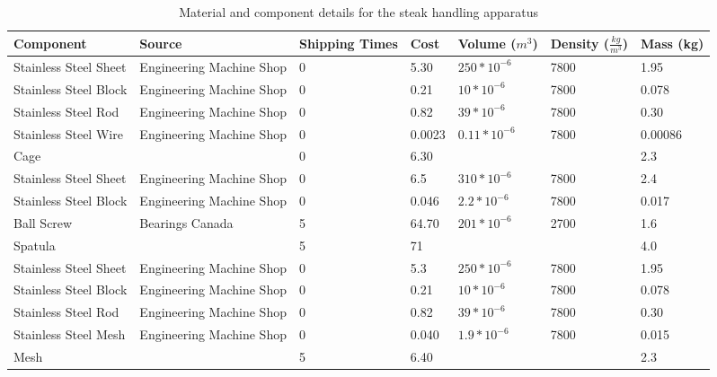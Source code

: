\documentclass[11pt]{article}
\begin{document}
\begin{table}[H]
\begin{tabularx}{\textwidth}{l l Z Z Z Z Z}

\hline

Component & Source & Shipping Times & Cost & Volume ($ m^3 $) & Density ($ \frac{kg}{m^3} $) & Mass (kg) \\

\hline

Stainless Steel Sheet & Engineering Machine Shop & 0 & 5.30 & $250*10^{-6}$ & 7800 \cite{densities} & 1.95 \\
Stainless Steel Block & Engineering Machine Shop & 0 & 0.21 & $10*10^{-6}$ & 7800 \cite{densities} & 0.078 \\
Stainless Steel Rod & Engineering Machine Shop & 0 & 0.82 & $39*10^{-6}$ & 7800 \cite{densities} & 0.30 \\
Stainless Steel Wire & Engineering Machine Shop & 0 & 0.0023 & $0.11*10^{-6}$ & 7800 \cite{densities} & 0.00086 \\

\hline

Cage & & 0 & 6.30 & & & 2.3 \\

\hline

Stainless Steel Sheet & Engineering Machine Shop & 0 & 6.5 & $310*10^{-6}$ & 7800 \cite{densities} & 2.4 \\
Stainless Steel Block & Engineering Machine Shop & 0 & 0.046 & $2.2*10^{-6}$ & 7800 \cite{densities} & 0.017 \\
Ball Screw & Bearings Canada \cite{ballscrew} & 5 & 64.70 \cite{ballscrew} & $ 201 * 10^{-6} $ & 2700 \cite{densities} & 1.6 \\

\hline

Spatula & & 5 & 71 & & & 4.0 \\

\hline

Stainless Steel Sheet & Engineering Machine Shop & 0 & 5.3 & $250*10^{-6}$ & 7800 \cite{densities} & 1.95 \\
Stainless Steel Block & Engineering Machine Shop & 0 & 0.21 & $10*10^{-6}$ & 7800 \cite{densities} & 0.078 \\
Stainless Steel Rod & Engineering Machine Shop & 0 & 0.82 & $39*10^{-6}$ & 7800 \cite{densities} & 0.30 \\
Stainless Steel Mesh & Engineering Machine Shop & 0 & 0.040 & $1.9*10^{-6}$ & 7800 \cite{densities} & 0.015 \\

\hline

Mesh & & 5 & 6.40 & & & 2.3 \\

\hline

\end{tabularx}
\caption{Material and component details for the steak handling apparatus}
\label{table:steak handling apparatus materials}
\end{table}
\end{document}
